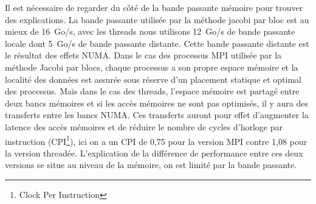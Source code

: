 Il est nécessaire de regarder du côté de la bande passante mémoire pour trouver des explications.
%
La bande passante utilisée par la méthode jacobi par bloc est au mieux de 16~Go/s, avec les threads nous utilisons 12~Go/s de bande passante locale dont 5~Go/s de bande passante distante.
%
Cette bande passante distante est le résultat des effets NUMA.
%
Dans le cas des processus MPI utilisée par la méthode Jacobi par blocs, chaque processus a son propre espace mémoire et la localité des données est assurée sous réserve d'un placement statique et optimal des processus.
%
Mais dans le cas des threads, l'espace mémoire est partagé entre deux bancs mémoires et si les accès mémoires ne sont pas optimisés, il y aura des transferts entre les bancs NUMA.
%
Ces transferts auront pour effet d'augmenter la latence des accès mémoires et de réduire le nombre de cycles d'horloge par instruction (CPI\footnote{Clock Per Instruction}), ici on a un CPI de 0,75 pour la version MPI contre 1,08 pour la version threadée.
%
L'explication de la différence de performance entre ces deux versions se situe au niveau de la mémoire, on est limité par la bande passante.




